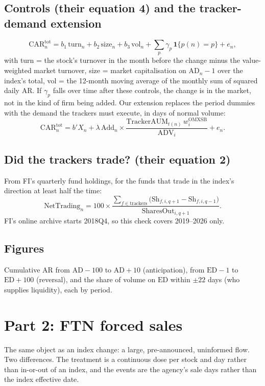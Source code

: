 \documentclass[11pt,a4paper]{article}
\newcommand{\AD}{\mathrm{AD}}
\newcommand{\ED}{\mathrm{ED}}
\newcommand{\ADV}{\mathrm{ADV}}
\newcommand{\CAR}{\mathrm{CAR}}
\newcommand{\AR}{\mathrm{AR}}
\begin{document}
\subsection{Controls (their equation 4) and the tracker-demand extension}
\begin{equation}
\CAR_n^{\text{tot}} = b_1\,\text{turn}_n + b_2\,\text{size}_n + b_3\,\text{vol}_n + \sum_p \gamma_p\,\mathbf 1\{p(n)=p\} + e_n,
\end{equation}
with turn = the stock's turnover in the month before the change minus the value-weighted market turnover, size = market capitalisation on $\AD_n - 1$ over the index's total, vol = the 12-month moving average of the monthly sum of squared daily $\AR$. If $\gamma_p$ falls over time after these controls, the change is in the market, not in the kind of firm being added. Our extension replaces the period dummies with the demand the trackers must execute, in days of normal volume:
\begin{equation}
\CAR_n^{\text{tot}} = b'X_n + \lambda\,\text{Add}_n \times \frac{\text{TrackerAUM}_{t(n)}\, w^{\text{OMXSB}}_{i}}{\ADV_i} + e_n.
\end{equation}

\subsection{Did the trackers trade? (their equation 2)}
From FI's quarterly fund holdings, for the funds that trade in the index's direction at least half the time:
\begin{equation}
\text{NetTrading}_n = 100 \times \frac{\sum_{f\in\text{trackers}}\big(\text{Sh}_{f,i,q+1} - \text{Sh}_{f,i,q-1}\big)}{\text{SharesOut}_{i,q+1}}.
\end{equation}
FI's online archive starts 2018Q4, so this check covers 2019--2026 only.

\subsection{Figures}
Cumulative $\AR$ from $\AD - 100$ to $\AD + 10$ (anticipation), from $\ED - 1$ to $\ED + 100$ (reversal), and the share of volume on $\ED$ within $\pm 22$ days (who supplies liquidity), each by period.

\section{Part 2: FTN forced sales}

The same object as an index change: a large, pre-announced, uninformed flow. Two differences. The treatment is a continuous dose per stock and day rather than in-or-out of an index, and the events are the agency's sale days rather than the index effective date.
\end{document}
